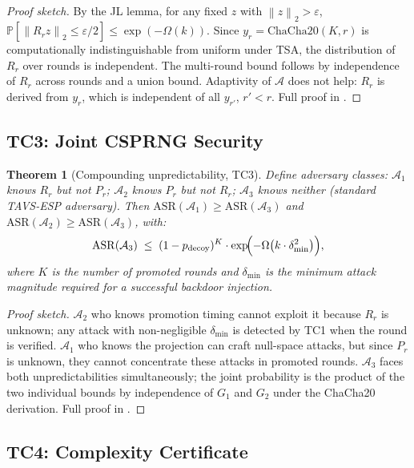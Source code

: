 \documentclass{article}
\newtheorem{theorem}{Theorem}
\renewcommand{\Pr}{\mathbb{P}}
\newcommand{\norm}[1]{\left\lVert #1 \right\rVert}
\newcommand{\TAVESP}{\textsc{TAVS-ESP}}
\begin{document}
\begin{proof}[Proof sketch]
By the JL lemma, for any fixed $z$ with $\norm{z}_2 > \varepsilon$,
$\Pr[\norm{R_r z}_2 \leq \varepsilon/2] \leq \exp(-\Omega(k))$.
Since $y_r = \mathrm{ChaCha20}(K, r)$ is computationally indistinguishable
from uniform under TSA, the distribution of $R_r$ over rounds is independent.
The multi-round bound follows by independence of $R_r$ across rounds and a
union bound.
Adaptivity of $\mathcal{A}$ does not help: $R_r$ is derived from $y_r$, which
is independent of all $y_{r'}$, $r' < r$.
Full proof in .
\end{proof}

\subsection{TC3: Joint CSPRNG Security}

\begin{theorem}[Compounding unpredictability, TC3]
\label{thm:joint_security}
Define adversary classes:
$\mathcal{A}_1$ knows $R_r$ but not $P_r$;
$\mathcal{A}_2$ knows $P_r$ but not $R_r$;
$\mathcal{A}_3$ knows neither (standard \TAVESP{} adversary).
Then $\mathrm{ASR}(\mathcal{A}_1) \geq \mathrm{ASR}(\mathcal{A}_3)$
and $\mathrm{ASR}(\mathcal{A}_2) \geq \mathrm{ASR}(\mathcal{A}_3)$, with:
\[
  \mathrm{ASR}(\mathcal{A}_3)
  \;\leq\;
  (1 - p_{\mathrm{decoy}})^K
  \cdot
  \exp\!\Bigl(-\Omega\bigl(k \cdot \delta_{\min}^2\bigr)\Bigr),
\]
where $K$ is the number of promoted rounds and $\delta_{\min}$ is the minimum
attack magnitude required for a successful backdoor injection.
\end{theorem}

\begin{proof}[Proof sketch]
$\mathcal{A}_2$ who knows promotion timing cannot exploit it because $R_r$ is
unknown; any attack with non-negligible $\delta_{\min}$ is detected by TC1 when
the round is verified.
$\mathcal{A}_1$ who knows the projection can craft null-space attacks, but
since $P_r$ is unknown, they cannot concentrate these attacks in promoted
rounds.
$\mathcal{A}_3$ faces both unpredictabilities simultaneously; the joint
probability is the product of the two individual bounds by independence of $G_1$
and $G_2$ under the ChaCha20 derivation.
Full proof in .
\end{proof}

\subsection{TC4: Complexity Certificate}
\end{document}
